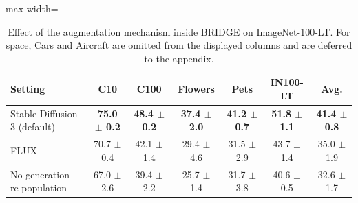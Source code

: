 \begin{table}[t]
\centering
\scriptsize
\setlength{\tabcolsep}{3.5pt}
\caption{Effect of the augmentation mechanism inside BRIDGE on ImageNet-100-LT. For space, Cars and Aircraft are omitted from the displayed columns and are deferred to the appendix.}
\label{tab:main_ablation_generation}
\begin{adjustbox}{max width=\textwidth}
\begin{tabular}{l c c c c c c}
\toprule
Setting & C10 & C100 & Flowers & Pets & IN100-LT & Avg. \\
\midrule
Stable Diffusion 3 (default) & \textbf{75.0 {\scriptsize$\pm$ 0.2}} & \textbf{48.4 {\scriptsize$\pm$ 0.2}} & \textbf{37.4 {\scriptsize$\pm$ 2.0}} & \textbf{41.2 {\scriptsize$\pm$ 0.7}} & \textbf{51.8 {\scriptsize$\pm$ 1.1}} & \textbf{41.4 {\scriptsize$\pm$ 0.8}} \\
FLUX & 70.7 {\scriptsize$\pm$ 0.4} & 42.1 {\scriptsize$\pm$ 1.4} & 29.4 {\scriptsize$\pm$ 4.6} & 31.5 {\scriptsize$\pm$ 2.9} & 43.7 {\scriptsize$\pm$ 1.4} & 35.0 {\scriptsize$\pm$ 1.9} \\
No-generation re-population & 67.0 {\scriptsize$\pm$ 2.6} & 39.4 {\scriptsize$\pm$ 2.2} & 25.7 {\scriptsize$\pm$ 1.4} & 31.7 {\scriptsize$\pm$ 3.8} & 40.6 {\scriptsize$\pm$ 0.5} & 32.6 {\scriptsize$\pm$ 1.7} \\
\bottomrule
\end{tabular}
\end{adjustbox}
\end{table}

